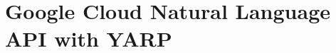 \chapter{Google Cloud Natural Language API with YARP}
\label{md__2home_2runner_2work_2speech_2speech_2gh-pages_2speechInteraction_2modules_2googleSpeechProcess_2README}
